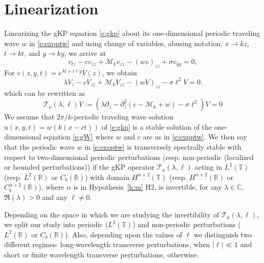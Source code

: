 \documentclass[12pt]{amsart}    %
\newcommand{\T}{\mathbb{T}}
\newcommand{\R}{\mathbb{R}}
\newcommand{\C}{\mathbb{C}}
\newcommand{\calM}{\mathcal{M}}
\numberwithin{equation}{section}
\begin{document}
\section{Linearization}\label{sec:lin}
Linearizing the gKP equation \eqref{e:gkp} about its one-dimensional periodic traveling wave $w$ in \eqref{e:expptw} and using change of variables, abusing notation, $x\to k z$, $t\to k t$, and $y\to ky$, we arrive at
\begin{equation}\label{e:gkplin}
v_{tz}-c v_{zz}+\calM_k v_{zz}-(w v)_{zz}+\sigma v_{yy}=0,
\end{equation}
For $v(z,y,t)=e^{\lambda t+i\ell y}V(z)$, we obtain
\[
\lambda V_z-c V_{zz}+\calM_k V_{zz}-(w V)_{zz}-\sigma \ell^2 V=0.
\]
which can be rewritten as
\begin{equation}\label{E:opt}
\mathcal T_a(\lambda,\ell) V:=(\lambda\partial_z- \partial_z^2(c-\calM_k+w)-\sigma\ell^2)V=0
\end{equation}
We assume that $2\pi/k$-periodic traveling wave solution $u(x,y,t)=w(k(x-ct))$ of \eqref{e:gkp} is a stable solution of the one-dimensional equation \eqref{e:gW} where $w$ and $c$ are as in \eqref{e:expptw}. We then say that the periodic wave $w$ in \eqref{e:expptw} is transversely spectrally stable with respect to two-dimensional periodic perturbations (resp. non-periodic (localized or bounded perturbations)) if the gKP operator $\mathcal T_a(\lambda,\ell)$ acting in $L^2(\T)$ (resp.  $L^2(\R)$ or $C_b(\R)$)  with domain $H^{\alpha+2}(\T)$  (resp.  $H^{\alpha+2}(\R)$ or   $C_b^{\alpha+2}(\R)$), where $\alpha$ is in Hypothesis~\ref{h:m} H2,
is invertible, for any $\lambda\in\C$, $\Re(\lambda)>0$ and any $\ell\neq 0$. 


Depending on the space in which we are studying the invertibility of $\mathcal T_a(\lambda,\ell)$, we split our study into periodic ($L^2(\T)$) and non-periodic perturbations ($L^2(\R)$ or $C_b(\R)$). Also, depending upon the values of $\ell$ we distinguish two different regimes: long-wavelength transverse perturbations, when $|\ell|\ll 1$ and short or finite wavelength transverse perturbations, otherwise.
\end{document}
